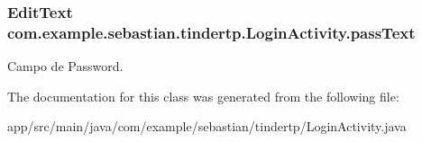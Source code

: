 \subsubsection[{\texorpdfstring{pass\+Text}{passText}}]{\setlength{\rightskip}{0pt plus 5cm}Edit\+Text com.\+example.\+sebastian.\+tindertp.\+Login\+Activity.\+pass\+Text\hspace{0.3cm}{\ttfamily [private]}}\hypertarget{classcom_1_1example_1_1sebastian_1_1tindertp_1_1LoginActivity_a8590bdba6d094c75f8dd360c5a78c928}{}\label{classcom_1_1example_1_1sebastian_1_1tindertp_1_1LoginActivity_a8590bdba6d094c75f8dd360c5a78c928}
Campo de Password. 

The documentation for this class was generated from the following file\+:\begin{DoxyCompactItemize}
\item 
app/src/main/java/com/example/sebastian/tindertp/Login\+Activity.\+java\end{DoxyCompactItemize}

